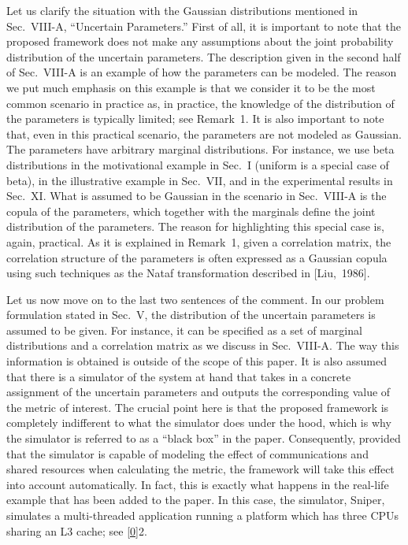 \begin{authors}
Let us clarify the situation with the Gaussian distributions mentioned in
Sec.~VIII-A, ``Uncertain Parameters.'' First of all, it is important to note
that the proposed framework does not make any assumptions about the joint
probability distribution of the uncertain parameters. The description given in
the second half of Sec.~VIII-A is an example of how the parameters can be
modeled. The reason we put much emphasis on this example is that we consider it
to be the most common scenario in practice as, in practice, the knowledge of the
distribution of the parameters is typically limited; see Remark~1. It is also
important to note that, even in this practical scenario, the parameters are not
modeled as Gaussian. The parameters have arbitrary marginal distributions. For
instance, we use beta distributions in the motivational example in Sec.~I
(uniform is a special case of beta), in the illustrative example in Sec.~VII,
and in the experimental results in Sec.~XI. What is assumed to be Gaussian in
the scenario in Sec.~VIII-A is the copula of the parameters, which together with
the marginals define the joint distribution of the parameters. The reason for
highlighting this special case is, again, practical. As it is explained in
Remark~1, given a correlation matrix, the correlation structure of the
parameters is often expressed as a Gaussian copula using such techniques as the
Nataf transformation described in [Liu,~1986].

Let us now move on to the last two sentences of the comment. In our problem
formulation stated in Sec.~V, the distribution of the uncertain parameters is
assumed to be given. For instance, it can be specified as a set of marginal
distributions and a correlation matrix as we discuss in Sec.~VIII-A. The way
this information is obtained is outside of the scope of this paper. It is also
assumed that there is a simulator of the system at hand that takes in a concrete
assignment of the uncertain parameters and outputs the corresponding value of
the metric of interest. The crucial point here is that the proposed framework is
completely indifferent to what the simulator does under the hood, which is why
the simulator is referred to as a ``black box'' in the paper. Consequently,
provided that the simulator is capable of modeling the effect of communications
and shared resources when calculating the metric, the framework will take this
effect into account automatically. In fact, this is exactly what happens in the
real-life example that has been added to the paper. In this case, the simulator,
Sniper, simulates a multi-threaded application running a platform which has
three CPUs sharing an L3 cache; see \cref{0}{2}.

\begin{actions}

\end{actions}
\end{authors}
